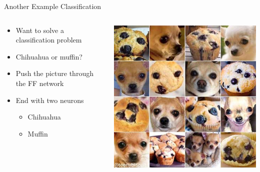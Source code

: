 \documentclass[aspectratio=169]{beamer}
\begin{document}
\begin{frame}{Another Example Classification}

\begin{columns}
\begin{column}{0.6\textwidth}
\begin{itemize}
	\item Want to solve a classification problem
	\item Chihuahua or muffin?
	\item Push the picture through the FF network
	\item End with two neurons
	\begin{itemize}
		\item Chihuahua
		\item Muffin
	\end{itemize}
	
\end{itemize}
\end{column}
\begin{column}{0.4\textwidth}
\includegraphics[width=1\textwidth]{lectFF/dogOrMuffin.jpeg}
\end{column}
\end{columns}
	\end{frame}
\end{document}
